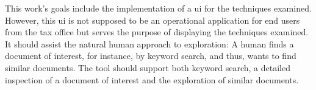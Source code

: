 This work's goals include the implementation of a \ac{ui} for the techniques examined.
However, this \ac{ui} is not supposed to be an operational application for end users from the tax office 
but serves the purpose of displaying the techniques examined.
It should assist the natural human approach to exploration:
A human finds a document of interest, for instance, by keyword search, and thus, wants to find similar documents.
The tool should support both keyword search, a detailed inspection of a document of interest and the exploration of similar documents.